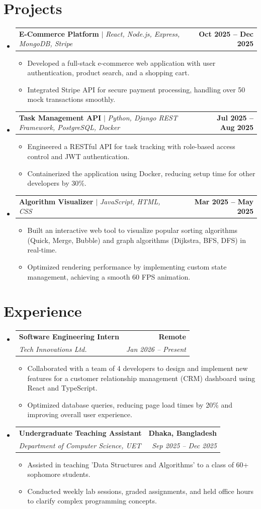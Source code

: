 \documentclass[11pt,a4paper]{article}
\newcommand{\resumeItem}[1]{
  \item \small \RaggedRight #1
}
\newcommand{\resumeSubheading}[4]{
  \vspace{-2pt}\item
    \begin{tabularx}{\linewidth}{X r}
      \textbf{#1} & \textbf{\small #2} \\
      \textit{\small#3} & \textit{\small #4} \\
    \end{tabularx}\vspace{-7pt}
}
\newcommand{\resumeProjectHeading}[2]{
  \vspace{-2pt}\item
    \begin{tabularx}{\linewidth}{X r}
      #1 & \textbf{\small #2} \\
    \end{tabularx}\vspace{-7pt}
}
\newcommand{\resumeSubHeadingListStart}{\begin{itemize}[leftmargin=0.0in, label={}]}
\newcommand{\resumeSubHeadingListEnd}{\end{itemize}\vspace{-4pt}}
\newcommand{\resumeItemListStart}{\begin{itemize}[leftmargin=0.15in, rightmargin=0in]}
\newcommand{\resumeItemListEnd}{\end{itemize}\vspace{-4pt}}
\begin{document}
\section*{Projects}
\resumeSubHeadingListStart
  \resumeProjectHeading
    {\textbf{E-Commerce Platform} $|$ \emph{React, Node.js, Express, MongoDB, Stripe}}{Oct 2025 -- Dec 2025}
    \resumeItemListStart
      \resumeItem{Developed a full-stack e-commerce web application with user authentication, product search, and a shopping cart.}
      \resumeItem{Integrated Stripe API for secure payment processing, handling over 50 mock transactions smoothly.}
    \resumeItemListEnd

  \resumeProjectHeading
    {\textbf{Task Management API} $|$ \emph{Python, Django REST Framework, PostgreSQL, Docker}}{Jul 2025 -- Aug 2025}
    \resumeItemListStart
      \resumeItem{Engineered a RESTful API for task tracking with role-based access control and JWT authentication.}
      \resumeItem{Containerized the application using Docker, reducing setup time for other developers by 30\%.}
    \resumeItemListEnd

  \resumeProjectHeading
    {\textbf{Algorithm Visualizer} $|$ \emph{JavaScript, HTML, CSS}}{Mar 2025 -- May 2025}
    \resumeItemListStart
      \resumeItem{Built an interactive web tool to visualize popular sorting algorithms (Quick, Merge, Bubble) and graph algorithms (Dijkstra, BFS, DFS) in real-time.}
      \resumeItem{Optimized rendering performance by implementing custom state management, achieving a smooth 60 FPS animation.}
    \resumeItemListEnd
\resumeSubHeadingListEnd

\section*{Experience}
\resumeSubHeadingListStart
  \resumeSubheading
    {Software Engineering Intern}{Remote}
    {Tech Innovations Ltd.}{Jan 2026 -- Present}
    \resumeItemListStart
      \resumeItem{Collaborated with a team of 4 developers to design and implement new features for a customer relationship management (CRM) dashboard using React and TypeScript.}
      \resumeItem{Optimized database queries, reducing page load times by 20\% and improving overall user experience.}
    \resumeItemListEnd

  \resumeSubheading
    {Undergraduate Teaching Assistant}{Dhaka, Bangladesh}
    {Department of Computer Science, UET}{Sep 2025 -- Dec 2025}
    \resumeItemListStart
      \resumeItem{Assisted in teaching 'Data Structures and Algorithms' to a class of 60+ sophomore students.}
      \resumeItem{Conducted weekly lab sessions, graded assignments, and held office hours to clarify complex programming concepts.}
    \resumeItemListEnd
\resumeSubHeadingListEnd
\end{document}
